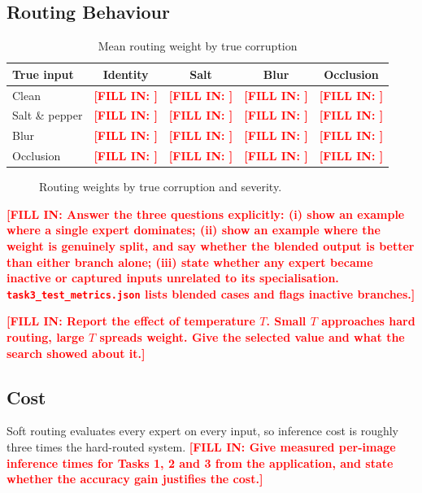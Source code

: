 \documentclass[conference]{IEEEtran}
\newcommand{\PLACEHOLDER}[1]{\textcolor{red}{\textbf{[FILL IN: #1]}}}
\begin{document}
\subsection{Routing Behaviour}
\begin{table}[t]
\caption{Mean routing weight by true corruption}
\label{tab:task3routing}
\centering
\begin{tabular}{@{}lcccc@{}}
\toprule
\textbf{True input} & \textbf{Identity} & \textbf{Salt} & \textbf{Blur} &
\textbf{Occlusion} \\
\midrule
Clean & \PLACEHOLDER{} & \PLACEHOLDER{} & \PLACEHOLDER{} & \PLACEHOLDER{} \\
Salt \& pepper & \PLACEHOLDER{} & \PLACEHOLDER{} & \PLACEHOLDER{} & \PLACEHOLDER{} \\
Blur & \PLACEHOLDER{} & \PLACEHOLDER{} & \PLACEHOLDER{} & \PLACEHOLDER{} \\
Occlusion & \PLACEHOLDER{} & \PLACEHOLDER{} & \PLACEHOLDER{} & \PLACEHOLDER{} \\
\bottomrule
\end{tabular}
\end{table}

\begin{figure}[t]
\centering
\caption{Routing weights by true corruption and severity.}
\label{fig:task3heat}
\end{figure}

\PLACEHOLDER{Answer the three questions explicitly: (i) show an example where a
single expert dominates; (ii) show an example where the weight is genuinely
split, and say whether the blended output is better than either branch alone;
(iii) state whether any expert became inactive or captured inputs unrelated to
its specialisation. \texttt{task3\_test\_metrics.json} lists blended cases and
flags inactive branches.}

\PLACEHOLDER{Report the effect of temperature $T$. Small $T$ approaches hard
routing, large $T$ spreads weight. Give the selected value and what the search
showed about it.}

\subsection{Cost}
Soft routing evaluates every expert on every input, so inference cost is
roughly three times the hard-routed system.
\PLACEHOLDER{Give measured per-image inference times for Tasks 1, 2 and 3 from
the application, and state whether the accuracy gain justifies the cost.}
\end{document}
